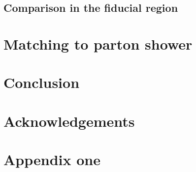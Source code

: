 \documentclass[11pt,epsf]{article}
\begin{document}


\subsection{Comparison in the fiducial region}






\section{Matching to parton shower}
\label{sec:matching}



\section{Conclusion}
\label{sec:conclusion}




\section*{Acknowledgements}



\appendix

\section{Appendix one}




\end{document}
